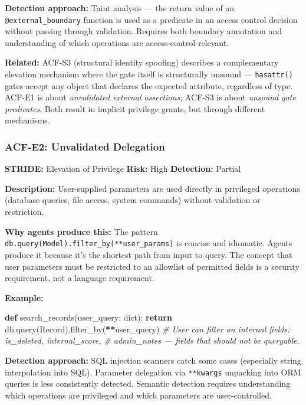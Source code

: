 \documentclass[a4paper,11pt]{report}
\newenvironment{Shaded}{\begin{snugshade}}{\end{snugshade}}
\newcommand{\BuiltInTok}[1]{#1}
\newcommand{\CommentTok}[1]{\textcolor[rgb]{0.56,0.35,0.01}{\textit{#1}}}
\newcommand{\ControlFlowTok}[1]{\textcolor[rgb]{0.13,0.29,0.53}{\textbf{#1}}}
\newcommand{\KeywordTok}[1]{\textcolor[rgb]{0.13,0.29,0.53}{\textbf{#1}}}
\newcommand{\NormalTok}[1]{#1}
\newcommand{\OperatorTok}[1]{\textcolor[rgb]{0.81,0.36,0.00}{\textbf{#1}}}
\begin{document}
\textbf{Detection approach:} Taint analysis --- the return value of an
\texttt{@external\_boundary} function is used as a predicate in an
access control decision without passing through validation. Requires
both boundary annotation and understanding of which operations are
access-control-relevant.

\textbf{Related:} ACF-S3 (structural identity spoofing) describes a
complementary elevation mechanism where the gate itself is structurally
unsound --- \texttt{hasattr()} gates accept any object that declares the
expected attribute, regardless of type. ACF-E1 is about
\emph{unvalidated external assertions}; ACF-S3 is about \emph{unsound
gate predicates}. Both result in implicit privilege grants, but through
different mechanisms.

\hypertarget{acf-e2-unvalidated-delegation}{%
\subsubsection{ACF-E2: Unvalidated
Delegation}\label{acf-e2-unvalidated-delegation}}

\textbf{STRIDE:} Elevation of Privilege \textbar{} \textbf{Risk:} High
\textbar{} \textbf{Detection:} Partial

\textbf{Description:} User-supplied parameters are used directly in
privileged operations (database queries, file access, system commands)
without validation or restriction.

\textbf{Why agents produce this:} The pattern
\texttt{db.query(Model).filter\_by(**user\_params)} is concise and
idiomatic. Agents produce it because it's the shortest path from input
to query. The concept that user parameters must be restricted to an
allowlist of permitted fields is a security requirement, not a language
requirement.

\textbf{Example:}

\begin{Shaded}
\begin{Highlighting}[]
\KeywordTok{def}\NormalTok{ search\_records(user\_query: }\BuiltInTok{dict}\NormalTok{):}
    \ControlFlowTok{return}\NormalTok{ db.query(Record).filter\_by(}\OperatorTok{**}\NormalTok{user\_query)}
    \CommentTok{\# User can filter on internal fields: is\_deleted, internal\_score,}
    \CommentTok{\# admin\_notes — fields that should not be queryable.}
\end{Highlighting}
\end{Shaded}

\textbf{Detection approach:} SQL injection scanners catch some cases
(especially string interpolation into SQL). Parameter delegation via
\texttt{**kwargs} unpacking into ORM queries is less consistently
detected. Semantic detection requires understanding which operations are
privileged and which parameters are user-controlled.
\end{document}
